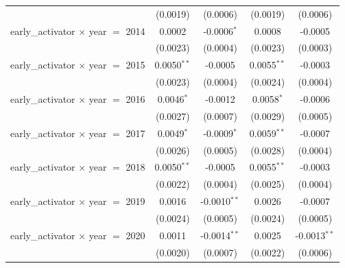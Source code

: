 \begin{tabular}{lcccc}
                                                   & (0.0019)           & (0.0006)                  & (0.0019)               & (0.0006)\\   
   early\_activator $\times$ year $=$ 2014         & 0.0002             & -0.0006$^{*}$             & 0.0008                 & -0.0005\\   
                                                   & (0.0023)           & (0.0004)                  & (0.0023)               & (0.0003)\\   
   early\_activator $\times$ year $=$ 2015         & 0.0050$^{**}$      & -0.0005                   & 0.0055$^{**}$          & -0.0003\\   
                                                   & (0.0023)           & (0.0004)                  & (0.0024)               & (0.0004)\\   
   early\_activator $\times$ year $=$ 2016         & 0.0046$^{*}$       & -0.0012                   & 0.0058$^{*}$           & -0.0006\\   
                                                   & (0.0027)           & (0.0007)                  & (0.0029)               & (0.0005)\\   
   early\_activator $\times$ year $=$ 2017         & 0.0049$^{*}$       & -0.0009$^{*}$             & 0.0059$^{**}$          & -0.0007\\   
                                                   & (0.0026)           & (0.0005)                  & (0.0028)               & (0.0004)\\   
   early\_activator $\times$ year $=$ 2018         & 0.0050$^{**}$      & -0.0005                   & 0.0055$^{**}$          & -0.0003\\   
                                                   & (0.0022)           & (0.0004)                  & (0.0025)               & (0.0004)\\   
   early\_activator $\times$ year $=$ 2019         & 0.0016             & -0.0010$^{**}$            & 0.0026                 & -0.0007\\   
                                                   & (0.0024)           & (0.0005)                  & (0.0024)               & (0.0005)\\   
   early\_activator $\times$ year $=$ 2020         & 0.0011             & -0.0014$^{**}$            & 0.0025                 & -0.0013$^{**}$\\   
                                                   & (0.0020)           & (0.0007)                  & (0.0022)               & (0.0006)\\   

\end{tabular}
